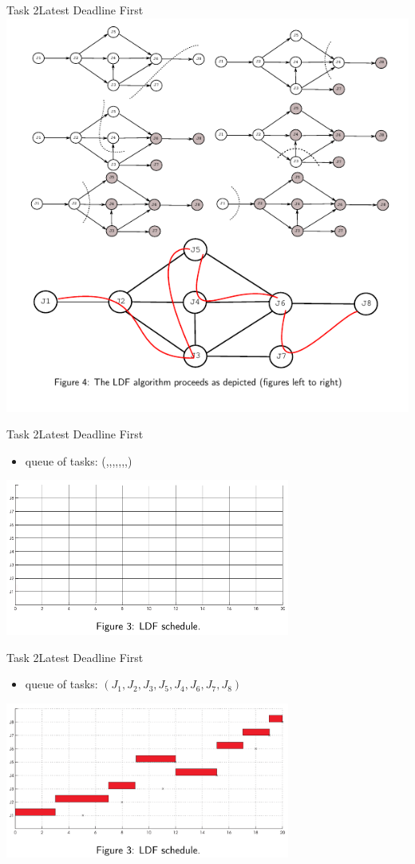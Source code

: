 \begin{frame}{Task 2}{Latest Deadline First}
  \centering
  \includegraphics[height=0.7\paperheight]{./figures/2_steps.png}
\end{frame}

\begin{frame}{Task 2}{Latest Deadline First}
  \begin{itemize}
    \item \alert{queue of tasks:} (\qquad,\qquad,\qquad,\qquad,\qquad,\qquad,\qquad,\qquad)
  \end{itemize}
  \centering
  \includegraphics[width=0.7\textwidth]{./figures/2_empty.png}
\end{frame}

\begin{frame}{Task 2}{Latest Deadline First}
  \begin{itemize}
    \item \alert{queue of tasks:}  $(J_1, J_2, J_3, J_5, J_4, J_6, J_7, J_8)$
  \end{itemize}
  \centering
  \includegraphics[width=0.7\textwidth]{./figures/2_sol.png}
\end{frame}

